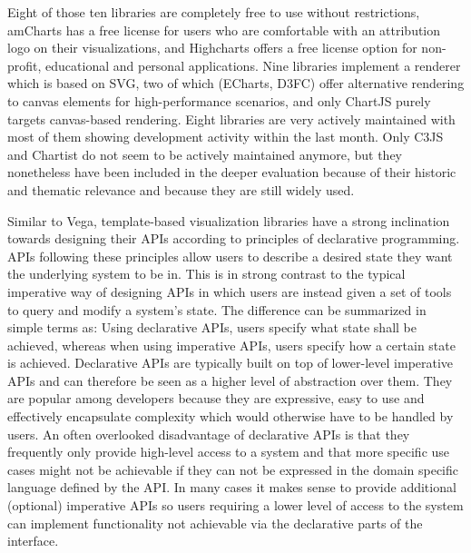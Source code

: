 Eight of those ten libraries are completely free to use without restrictions, amCharts has a free license for users who are comfortable with an attribution logo on their visualizations, and Highcharts offers a free license option for non-profit, educational and personal applications.
Nine libraries implement a renderer which is based on SVG, two of which (ECharts, D3FC) offer alternative rendering to canvas elements for high-performance scenarios, and only ChartJS purely targets canvas-based rendering.
Eight libraries are very actively maintained with most of them showing development activity within the last month.
Only C3JS and Chartist do not seem to be actively maintained anymore, but they nonetheless have been included in the deeper evaluation because of their historic and thematic relevance and because they are still widely used.

Similar to Vega, template-based visualization libraries have a strong inclination towards designing their APIs according to principles of declarative programming.
APIs following these principles allow users to describe a desired state they want the underlying system to be in.
This is in strong contrast to the typical imperative way of designing APIs in which users are instead given a set of tools to query and modify a system's state.
The difference can be summarized in simple terms as: Using declarative APIs, users specify what state shall be achieved, whereas when using imperative APIs, users specify how a certain state is achieved.
Declarative APIs are typically built on top of lower-level imperative APIs and can therefore be seen as a higher level of abstraction over them.
They are popular among developers because they are expressive, easy to use and effectively encapsulate complexity which would otherwise have to be handled by users.
An often overlooked disadvantage of declarative APIs is that they frequently only provide high-level access to a system and that more specific use cases might not be achievable if they can not be expressed in the domain specific language defined by the API.
In many cases it makes sense to provide additional (optional) imperative APIs so users requiring a lower level of access to the system can implement functionality not achievable via the declarative parts of the interface.

